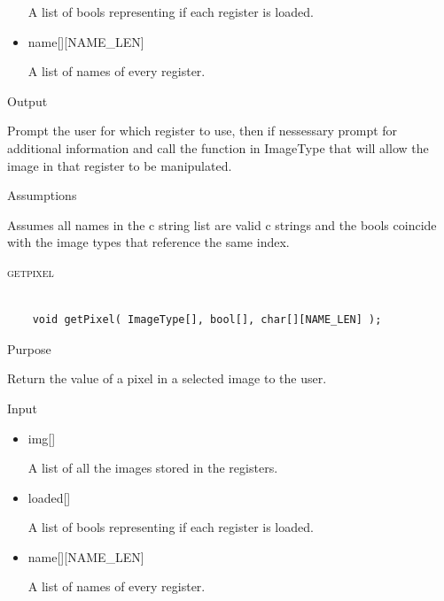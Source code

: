 \documentclass[pdftex, 11pt]{article}
\begin{document}
\begin{description}
\begin{description}
\begin{itemize}
						A list of bools representing if each register is loaded.

					\item{name[][NAME\_LEN]}

						A list of names of every register.

				\end{itemize}

			\item{Output}

				Prompt the user for which register to use, then if nessessary
				prompt for additional information and call the function
				in ImageType that will allow the image in that register to
				be manipulated.

			\item{Assumptions}

				Assumes all names in the c string list are valid c
				strings and the bools coincide with the image types that
				reference the same index.

		\end{description}



	\item{\textsc{getpixel}}

		\begin{lstlisting}

	void getPixel( ImageType[], bool[], char[][NAME_LEN] );
		\end{lstlisting}

		\begin{description}
			\item{Purpose}

				Return the value of a pixel in a selected image to the user.

			\item{Input}

				\begin{itemize}

					\item{img[]}

						A list of all the images stored in the registers.

					\item{loaded[]}

						A list of bools representing if each register is loaded.

					\item{name[][NAME\_LEN]}

						A list of names of every register.


\end{itemize}
\end{description}
\end{description}
\end{document}
